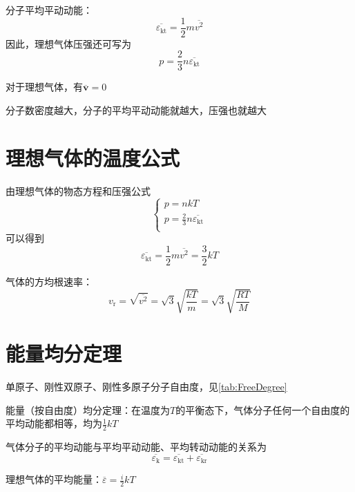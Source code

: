 \documentclass[12pt, a4paper, twoside]{ctexbook}
\begin{document}
{\sonti 分子平均平动动能}：
$$
\overline{\varepsilon_\mathrm{kt}}=\frac{1}{2}m\overline{v^2}
$$
因此，理想气体压强还可写为
$$
p=\frac{2}{3}n\overline{\varepsilon_\mathrm{kt}}
$$

对于理想气体，有$\overline{\boldsymbol{v}}=0$

分子数密度越大，分子的平均平动动能就越大，压强也就越大
\section{理想气体的温度公式}
由理想气体的物态方程和压强公式
$$
\left\{ \begin{array}{l}
	p=nkT\\
	p=\frac{2}{3}n\overline{\varepsilon _\mathrm{kt}}\\
\end{array} \right. 
$$
可以得到
$$
\overline{\varepsilon _\mathrm{kt}}=\frac{1}{2}m\overline{v^2}=\frac{3}{2}kT
$$

{\sonti 气体的方均根速率}：
$$
v_\mathrm{r}=\sqrt{\overline{v^2}}=\sqrt{3}\sqrt{\frac{kT}{m}}=\sqrt{3}\sqrt{\frac{RT}{M}}
$$
\section{能量均分定理}
单原子、刚性双原子、刚性多原子分子自由度，见\textcolor{blue}{\cref{tab:FreeDegree}}
\begin{table}[H]
    \centering
    \caption{单原子、刚性双原子、刚性多原子分子自由度}
    \label{tab:FreeDegree}
\end{table}

{\sonti 能量（按自由度）均分定理}：在温度为$T$的平衡态下，气体分子任何一个自由度的平均动能都相等，均为$\frac{1}{2}kT$

气体分子的平均动能与平均平动动能、平均转动动能的关系为
$$
\overline{\varepsilon_\mathrm{k}}=\overline{\varepsilon_\mathrm{kt}}+\overline{\varepsilon_\mathrm{kr}}
$$

{\sonti 理想气体的平均能量}：$\overline{\varepsilon}=\frac{i}{2}kT$
\end{document}
